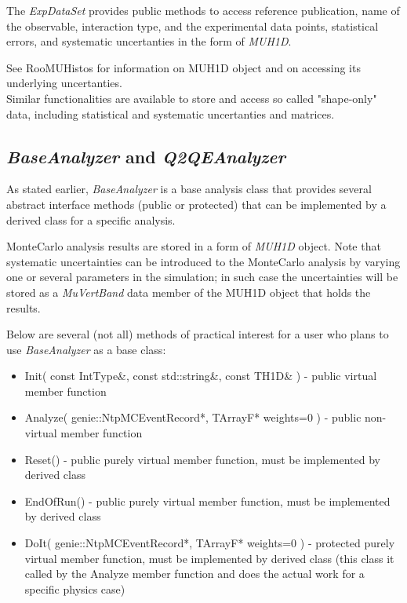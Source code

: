 The {\it ExpDataSet} provides public methods to access reference publication, name of the observable, interaction
type, and the experimental data points, statistical errors, and systematic uncertanties in the form of { \it MUH1D}.

See RooMUHistos\cite{roomuhistos} for information on MUH1D object and on accessing its underlying uncertanties.\\
Similar functionalities are available to store and access so called "shape-only" data, including statistical and
systematic uncertanties and matrices. 

\subsection{ {\it BaseAnalyzer} and {\it Q2QEAnalyzer} }

As stated earlier, {\it BaseAnalyzer} is a base analysis class that provides several abstract interface methods 
(public or protected) that can be implemented by a derived class for a specific analysis. 

MonteCarlo analysis results are stored in a form of {\it MUH1D} object. Note that systematic uncertainties can be 
introduced to the MonteCarlo analysis by varying one or several parameters in the simulation; in such case the 
uncertainties will be stored as a {\it MuVertBand} data member of the MUH1D object that holds the results. 

Below are several (not all) methods of practical interest for a user who plans to use {\it BaseAnalyzer }
as a base class:
\begin{itemize}
\item{ Init( const IntType\&, const std::string\&, const TH1D\& ) - public virtual member function}
\item{ Analyze( genie::NtpMCEventRecord*, TArrayF* weights=0 ) - public non-virtual member function}
\item{ Reset() - public purely virtual member function, must be implemented by derived class}
\item{ EndOfRun() - public purely virtual member function, must be implemented by derived class}
\item{ DoIt( genie::NtpMCEventRecord*, TArrayF* weights=0 ) - protected purely virtual member function, 
       must be implemented by derived class (this class it called by the Analyze member function and 
       does the actual work for a specific physics case) }
\end{itemize}
 
